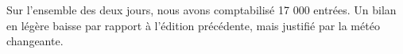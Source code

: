 \documentclass[12pt,a4paper]{report}
\begin{document}
Sur l'ensemble des deux jours, nous avons comptabilisé 17 000 entrées. Un bilan en légère baisse par rapport à l'édition précédente, mais justifié par la météo changeante.

%
%
%
\end{document}
